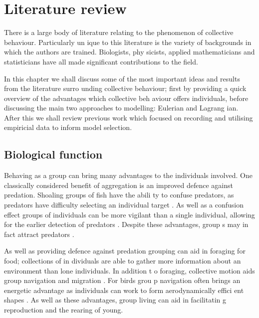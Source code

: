 \graphicspath{{fig/lit_review/}}

\chapter{Literature review}
\label{cha:lit_review}

There is a large body of literature relating to the phenomenon of collective behaviour. Particularly un
ique to this literature is the variety of backgrounds in which the authors are trained. Biologists, phy
sicists, applied mathematicians and statisticians have all made significant contributions to the field.


In this chapter we shall discuss some of the most important ideas and results from the literature surro
unding collective behaviour; first by providing a quick overview of the advantages which collective beh
aviour offers individuals, before discussing the main two approaches to modelling: Eulerian and Lagrang
ian. After this we shall review previous work which focused on recording and utilising empiricial data 
to inform model selection.

\section{Biological function}
\label{sec:biological_function}

Behaving as a group can bring many advantages to the individuals involved. One classically considered  
benefit of aggregation is an improved defence against predation. Shoaling groups of fish have the abili
ty to confuse predators, as predators have difficulty selecting an individual target \parencite{landeau
86}. As well as a confusion effect groups of individuals can be more vigilant than a single individual,
 allowing for the earlier detection of predators \parencite{pitcher93}. Despite these advantages, group
s may in fact attract predators \parencite{wittenberger85}.

As well as providing defence against predation grouping can aid in foraging for food; collections of in
dividuals are able to gather more information about an environment than lone individuals. In addition t
o foraging, collective motion aids group navigation and migration \parencite{simmons04}. For birds grou
p navigation often brings an energetic advantage as individuals can work to form aerodynamically effici
ent shapes \parencite{weimerskirch01}. As well as these advantages, group living can aid in facilitatin
g reproduction and the rearing of young.

